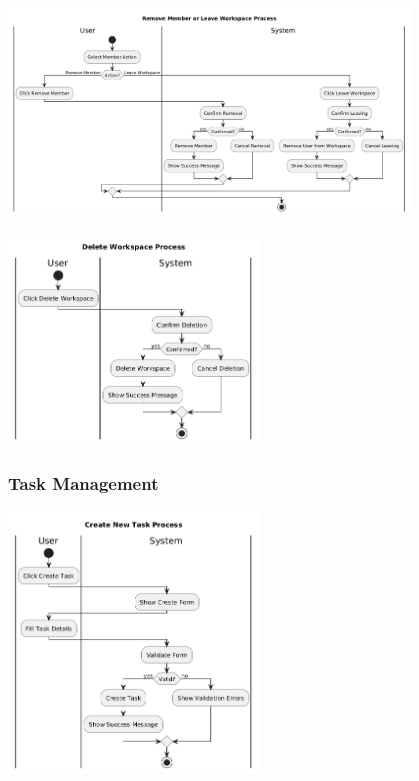 \begin{center}
    \includegraphics[width=0.8\textwidth]{assets/activity_diagrams/workspace_remove.png}
\end{center}

\begin{center}
    \includegraphics[width=0.5\textwidth]{assets/activity_diagrams/workspace_delete.png}
\end{center}

\subsubsection*{Task Management}
\begin{center}
    \includegraphics[width=0.5\textwidth]{assets/activity_diagrams/task_create.png}
\end{center}

